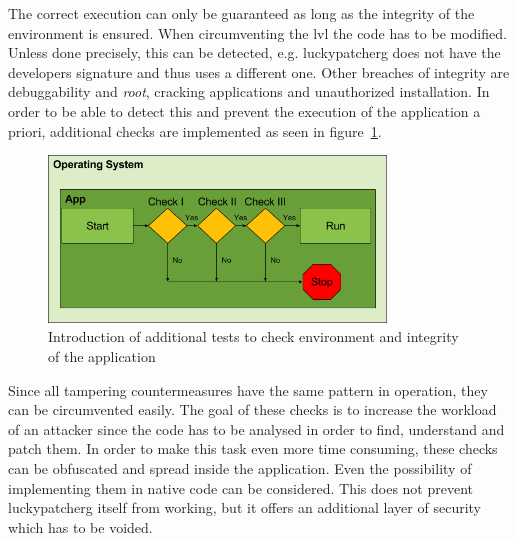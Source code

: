 The correct execution can only be guaranteed as long as the integrity of the environment is ensured.
When circumventing the \gls{lvl} the code has to be modified.
Unless done precisely, this can be detected, e.g. \gls{luckypatcherg} does not have the developers signature and thus uses a different one.
Other breaches of integrity are debuggability and \textit{root}, cracking applications and unauthorized installation.
In order to be able to detect this and prevent the execution of the application a priori, additional checks are implemented as seen in figure~\ref{fig:verificationNowAdditional}.
\begin{figure}[h]
    \centering
    \includegraphics[width=0.8\textwidth]{data/verificationNowAdditional.png}
    \caption{Introduction of additional tests to check environment and integrity of the application}
    \label{fig:verificationNowAdditional}
\end{figure}
Since all tampering countermeasures have the same pattern in operation, they can be circumvented easily.
The goal of these checks is to increase the workload of an attacker since the code has to be analysed in order to find, understand and patch them.
In order to make this task even more time consuming, these checks can be obfuscated and spread inside the application.
Even the possibility of implementing them in native code can be considered.
\newline
This does not prevent \gls{luckypatcherg} itself from working, but it offers an additional layer of security which has to be voided.
